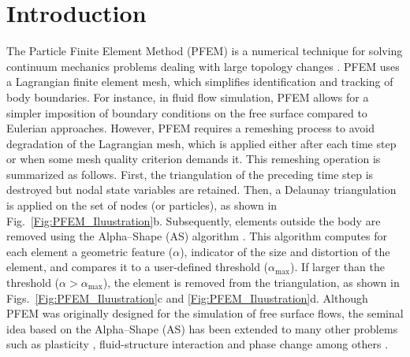 \documentclass[final,3p,times]{elsarticle}
\begin{document}

\section{Introduction}
\label{sec:Intro}

The Particle Finite Element Method (PFEM) is a numerical technique for solving continuum mechanics problems dealing with large topology changes \citep{idelsohn2004particle}. PFEM uses a Lagrangian finite element mesh, which simplifies identification and tracking of body boundaries. For instance, in fluid flow simulation, PFEM allows for a simpler imposition of boundary conditions on the free surface compared to Eulerian approaches. However, PFEM requires a remeshing process to avoid degradation of the Lagrangian mesh, which is applied either after each time step or when some mesh quality criterion demands it. This remeshing operation is summarized as follows. First, the triangulation of the preceding time step is destroyed but nodal state variables are retained. Then, a Delaunay triangulation is applied on the set of nodes (or particles), as shown in Fig.~\ref{Fig:PFEM_Iluustration}b. Subsequently, elements outside the body are removed using the Alpha--Shape (AS) algorithm \citep{edelsbrunner1994three}. This algorithm computes for each element a geometric feature ($\alpha$), indicator of the size and distortion of the element, and compares it to a user-defined threshold ($\alpha_\mathrm{max}$). If larger than the threshold ($\alpha > \alpha_\mathrm{max}$), the element is removed from the triangulation, as shown in Figs.~\ref{Fig:PFEM_Iluustration}c and \ref{Fig:PFEM_Iluustration}d. Although PFEM was originally designed for the simulation of free surface flows, the seminal idea based on the Alpha--Shape (AS) has been extended to many other problems such as plasticity \citep{carbonell2020modelling}, fluid-structure interaction \citep{cerquaglia2019fully,meduri2022lagrangian} and phase change \citep{bobach2021phase} among others \citep{sengani2020review,cremonesi2020state}.
\end{document}

